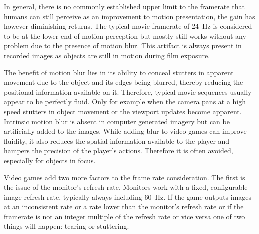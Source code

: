 In general, there is no commonly established upper limit to the framerate that humans can still perceive as an improvement to motion presentation, the gain has however diminishing returns. The typical movie framerate of \SI{24}{\hertz} is considered to be at the lower end of motion perception but mostly still works without any problem due to the presence of motion blur. This artifact is always present in recorded images as objects are still in motion during film exposure. %


The benefit of motion blur lies in its ability to conceal stutters in apparent movement due to the object and its edges being blurred, thereby reducing the positional information available on it.%
Therefore, typical movie sequences usually appear to be perfectly fluid. Only for example when the camera pans at a high speed stutters in object movement or the viewport updates become apparent. Intrinsic motion blur is absent in computer generated imagery but can be artificially added to the images. While adding blur to video games can improve fluidity, it also reduces the spatial information available to the player and hampers the precision of the player's actions. Therefore it is often avoided, especially for objects in focus.

Video games add two more factors to the frame rate consideration. The first is the issue of the monitor's refresh rate. Monitors work with a fixed, configurable image refresh rate, typically always including \SI{60}{\hertz}. If the game outputs images at an inconsistent rate or a rate lower than the monitor's refresh rate or if the framerate is not an integer multiple of the refresh rate or vice versa one of two things will happen: tearing or stuttering. %

